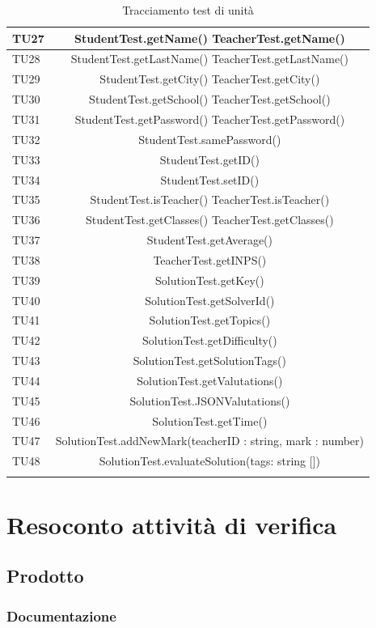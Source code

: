 \begin{longtable}{|>{\centering\arraybackslash}m{1.6cm}|c|}
		TU27 & StudentTest.getName() TeacherTest.getName()\\ \hline
		TU28 & StudentTest.getLastName() TeacherTest.getLastName()\\ \hline
		TU29 & StudentTest.getCity() TeacherTest.getCity()\\ \hline
		TU30 & StudentTest.getSchool() TeacherTest.getSchool()\\ \hline
		TU31 & StudentTest.getPassword() TeacherTest.getPassword()\\ \hline
		TU32 & StudentTest.samePassword()\\ \hline
		TU33 & StudentTest.getID()\\ \hline
		TU34 & StudentTest.setID()\\ \hline
		TU35 & StudentTest.isTeacher() TeacherTest.isTeacher()\\ \hline
		TU36 & StudentTest.getClasses() TeacherTest.getClasses()\\ \hline
		TU37 & StudentTest.getAverage()\\ \hline
		TU38 & TeacherTest.getINPS()\\ \hline
		TU39 & SolutionTest.getKey()\\ \hline
		TU40 & SolutionTest.getSolverId()\\ \hline
		TU41 & SolutionTest.getTopics()\\ \hline
		TU42 & SolutionTest.getDifficulty()\\ \hline
		TU43 & SolutionTest.getSolutionTags()\\ \hline
		TU44 & SolutionTest.getValutations()\\ \hline
		TU45 & SolutionTest.JSONValutations()\\ \hline
		TU46 & SolutionTest.getTime()\\ \hline
		TU47 & SolutionTest.addNewMark(teacherID : string, mark : number)\\ \hline
		TU48 & SolutionTest.evaluateSolution(tags: string [])\\ \hline
		\caption{Tracciamento test di unità}
\end{longtable}

	
\newpage
\section{Resoconto attività di verifica}
\subsection{Prodotto}
\subsubsection{Documentazione}
